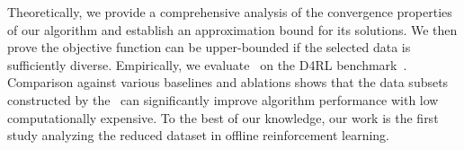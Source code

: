 

Theoretically, we provide a comprehensive analysis of the convergence properties of our algorithm and establish an approximation bound for its solutions. 
We then prove the objective function can be upper-bounded if the selected data is sufficiently diverse.
Empirically, we evaluate \name~on the D4RL benchmark~\citep{fu2020d4rl}. Comparison against various baselines and ablations shows that the data subsets constructed by the \name~can significantly improve algorithm performance with low computationally expensive.
To the best of our knowledge, our work is the first study analyzing the reduced dataset in offline reinforcement learning.





